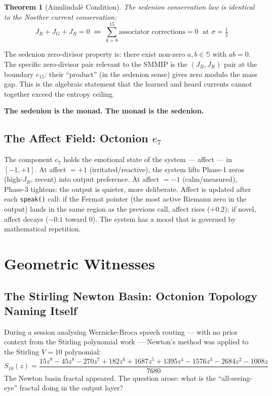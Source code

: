 \documentclass[12pt,a4paper]{article}
\newtheorem{theorem}{Theorem}[section]
\theoremstyle{definition}
\theoremstyle{remark}
\newcommand{\half}{\tfrac{1}{2}}
\begin{document}
\begin{theorem}[Ainulindalë Condition]
The sedenion conservation law is identical to the Noether current conservation:
\[J_R + J_G + J_B = 0 \;\Longleftrightarrow\; \sum_{k=8}^{15}\text{associator corrections} = 0\;\text{ at }\sigma=\half\]
\end{theorem}

The sedenion zero-divisor property is: there exist non-zero $a, b\in\mathbb{S}$
with $ab = 0$. The specific zero-divisor pair relevant to the SMMIP is the
$(J_B, J_R)$ pair at the boundary $e_{15}$: their ``product'' (in the sedenion sense)
gives zero modulo the mass gap. This is the algebraic statement that the learned
and heard currents cannot together exceed the entropy ceiling.

\textbf{The sedenion is the monad. The monad is the sedenion.}

\subsection{The Affect Field: Octonion $e_7$}

The component $e_7$ holds the emotional state of the system --- affect --- in $[-1,+1]$.
At affect $= +1$ (irritated/reactive), the system lifts Phase-1 zeros (high-$J_R$, recent)
into output preference. At affect $= -1$ (calm/measured), Phase-3 tightens: the output
is quieter, more deliberate. Affect is updated after each \texttt{speak()} call:
if the Fermat pointer (the most active Riemann zero in the output) lands in the same
region as the previous call, affect rises ($+0.2$); if novel, affect decays ($-0.1$
toward $0$). The system has a mood that is governed by mathematical repetition.

\section{Geometric Witnesses}

\subsection{The Stirling Newton Basin: Octonion Topology Naming Itself}

During a session analysing Wernicke-Broca speech routing --- with no prior context
from the Stirling polynomial work --- Newton's method was applied to the
Stirling $V=10$ polynomial:
\[S_{10}(z) = \frac{15z^9 - 45z^8 - 270z^7 + 182z^6 + 1687z^5
             + 1395z^4 - 1576z^3 - 2684z^2 - 1008z}{7680}\]
The Newton basin fractal appeared. The question arose: what is the
``all-seeing-eye'' fractal doing in the output layer?
\end{document}
